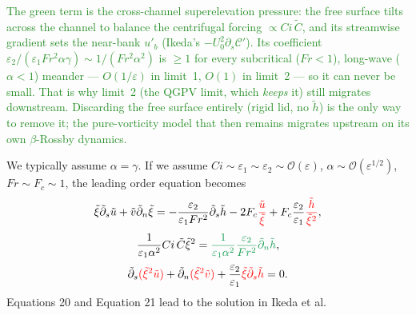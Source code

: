 \documentclass[11pt]{article}
\newcommand{\R}[1]{\textcolor{red}{#1}}
\newcommand{\G}[1]{\textcolor{ForestGreen}{#1}}
\newcommand{\dt}{\tilde{\partial}}
\begin{document}
\G{\small The green term is the cross-channel superelevation pressure: the free
surface tilts across the channel to balance the centrifugal forcing
$\propto Ci\,\tilde C$, and its streamwise gradient sets the near-bank $u'_b$
(Ikeda's $-U_0^2\partial_s\mathcal{C}'$). Its coefficient
$\varepsilon_2/(\varepsilon_1Fr^2\alpha\gamma)\sim1/(Fr^2\alpha^2)$ is $\ge1$ for
every subcritical ($Fr<1$), long-wave ($\alpha<1$) meander --- $O(1/\varepsilon)$
in limit~1, $O(1)$ in limit~2 --- so it can never be small. That is why limit~2
(the QGPV limit, which \emph{keeps} it) still migrates downstream. Discarding the
free surface entirely (rigid lid, no $\tilde h$) is the only way to remove it;
the pure-vorticity model that then remains migrates upstream on its own
$\beta$-Rossby dynamics.}

We typically assume $\alpha=\gamma$. If we assume
$Ci\sim\varepsilon_1\sim\varepsilon_2\sim\mathcal{O}(\varepsilon)$,
$\alpha\sim\mathcal{O}(\varepsilon^{1/2})$, $Fr\sim F_c\sim1$,
the leading order equation becomes
\begin{equation}
\tilde\xi\dt_s\tilde u+\tilde v\dt_n\tilde\xi
= -\frac{\varepsilon_2}{\varepsilon_1Fr^2}\dt_s\tilde h
  - 2F_c\R{\frac{\tilde u}{\tilde\xi}}
  + F_c\frac{\varepsilon_2}{\varepsilon_1}\R{\frac{\tilde h}{\tilde\xi^2}},
\end{equation}
\begin{equation}
\frac{1}{\varepsilon_1\alpha^2}Ci\,\tilde C\tilde\xi^2
= \G{\frac{1}{\varepsilon_1\alpha^2}\frac{\varepsilon_2}{Fr^2}\dt_n\tilde h},
\end{equation}
\begin{equation}
\dt_s\R{(\tilde\xi^2\tilde u)}+\dt_n\R{(\tilde\xi^2\tilde v)}
 + \frac{\varepsilon_2}{\varepsilon_1}
   \R{\tilde\xi\dt_s\tilde h} = 0 .
\end{equation}
Equations 20 and Equation 21 lead to the solution in Ikeda et al.
\end{document}
